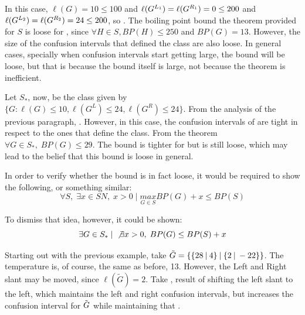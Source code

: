 In this case, $\ell(G) = 10 \leq 100$ and $\ell(\mbox{$G^{L_1}$}) = \ell(\mbox{$G^{R_1}$}) = 0 \leq 200$ and $\ell(\mbox{$G^{L_2}$}) = \ell(\mbox{$G^{R_2}$}) = 24 \leq 200$, so . The boiling point bound the theorem provided for $S$ is loose for \Gm{}, since $\forall H \in S, BP(H) \leq 250$ and $BP(G) = 13$. However, the size of the confusion intervals that defined the class are also loose. In general cases, specially when confusion intervals start getting large, the bound will be loose, but that is because the bound itself is large, not because the theorem is inefficient.

Let $S_*$, now, be the class given by $\{G : \ell(G)\leq10, \ell(G^L)\leq24, \ell(G^R)\leq24\}$. From the analysis of the previous paragraph, . However, in this case, the confusion intervals of \Gm{} are tight in respect to the ones that define the class. From the theorem $\forall G \in S_*,\; BP(G) \leq 29$. The bound is tighter for \Gm{} but is still loose, which may lead to the belief that this bound is loose in general.

In order to verify whether the bound is in fact loose, it would be required to show the following, or something similar:
$$
\forall S,\;\exists x\in SN,\; x>0\;|\; \underset{G\in S}{max}BP(G) + x \leq BP(S)
$$

To dismiss that idea, however, it could be shown:
$$
\exists G \in S_*\;|\;\not\exists x>0,\; BP(G)\leq BP(S)+x
$$

Starting out with the previous example, take $\tilde{G} = \mbox{$\{\mbox{$\{28\:|\:4\}$}\:|\:\mbox{$\{2\:|\:-22\}$}\}$}$. The temperature is, of course, the same as before, 13. However, the Left and Right slant may be moved, since $\ell(\tilde{G}) = 2$. Take , result of shifting the left slant to the left, which maintains the left and right confusion intervals, but increases the confusion interval for $\tilde{\mbox{$G$}}$ while maintaining that .

